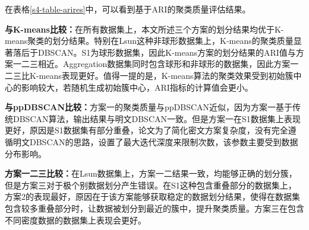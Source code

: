 \begin{table}[htbp]
	\centering
	\renewcommand{\arraystretch}{1.3}
	\caption{聚类质量评估}
	\label{s4-table-arires}
\end{table}

在表格\ref{s4-table-arires}中，可以看到基于ARI的聚类质量评估结果。

\begin{compactitem}
	\item \textbf{与K-means比较：}在所有数据集上，本文所述三个方案的划分结果均优于K-means聚类的划分结果。特别在Lsun这种非球形数据集上，K-means的聚类质量显著落后于DBSCAN。S1为球形数据集，因此K-means方案的划分结果的ARI值与方案一二三相近。Aggregation数据集同时包含球形和非球形的数据集，因此方案一二三比K-means表现更好。值得一提的是，K-means算法的聚类效果受到初始簇中心的影响较大，若随机生成初始簇中心，ARI指标的计算值会更小。
	\item
	\textbf{与ppDBSCAN比较：}方案一的聚类质量与ppDBSCAN近似，因为方案一基于传统DBSCAN算法，输出结果与明文DBSCAN一致。但是方案一在S1数据集上表现更好，原因是S1数据集有部分重叠，论文\cite{bozdemir2021privacy}为了简化密文方案复杂度，没有完全遵循明文DBSCAN的思路，设置了最大迭代深度来限制次数，该参数主要受到数据分布影响。
	\item
	\textbf{方案一二三比较：}在Lsun数据集上，方案一二结果一致，均能够正确的划分簇，但是方案三对于极个别数据划分产生错误。在S1这种包含重叠部分的数据集上，方案2的表现最好，原因在于该方案能够获取稳定的数据划分结果，使得在数据集包含较多重叠部分时，让数据被划分到最近的簇中，提升聚类质量。方案三在包含不同密度数据的数据集上表现会更好。
\end{compactitem}

